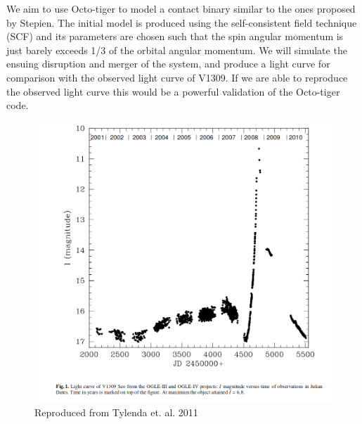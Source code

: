 \documentclass{article}
\begin{document}
We aim to use Octo-tiger to model a contact binary similar to the ones proposed by Stepien. The initial model is produced using the self-consistent field technique (SCF) and its parameters are chosen such that the spin angular momentum is just barely exceeds 1/3 of the orbital angular momentum. We will simulate the ensuing disruption and merger of the system, and produce a light curve for comparison with the observed light curve of V1309. If we are able to reproduce the observed light curve this would be a powerful validation of the Octo-tiger code. 

\begin{figure}
\begin{center}
\includegraphics[width=1.25\textwidth]{fig1}
\end{center}
\caption{Reproduced from Tylenda et. al. 2011}
\end{figure}
\end{document}
